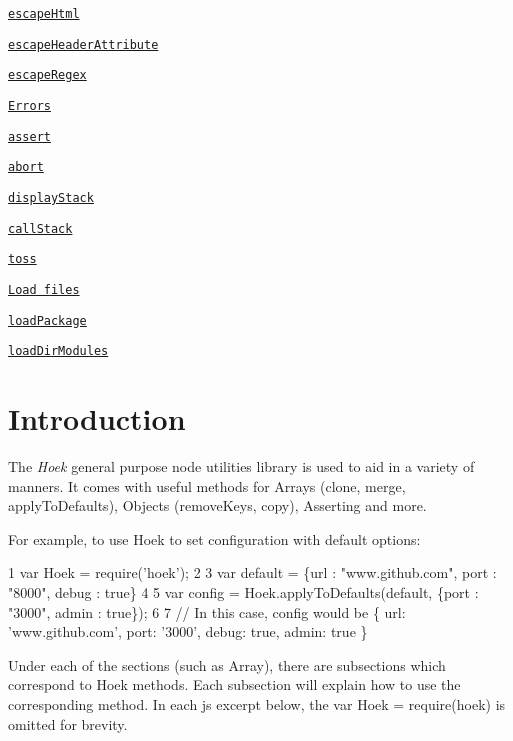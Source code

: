 \begin{DoxyItemize}
\begin{DoxyItemize}
\item \href{#escapeHtmlstring}{\tt escape\+Html}
\item \href{#escapeHeaderAttributeattribute}{\tt escape\+Header\+Attribute}
\item \href{#escapeRegexstring}{\tt escape\+Regex}
\end{DoxyItemize}
\item \href{#errors}{\tt Errors}
\begin{DoxyItemize}
\item \href{#assertmessage}{\tt assert}
\item \href{#abortmessage}{\tt abort}
\item \href{#displayStackslice}{\tt display\+Stack}
\item \href{#callStackslice}{\tt call\+Stack}
\item \href{#tosscondition}{\tt toss}
\end{DoxyItemize}
\item \href{#load-files}{\tt Load files}
\begin{DoxyItemize}
\item \href{#loadPackagedir}{\tt load\+Package}
\item \href{#loadDirModulespath-excludefiles-target}{\tt load\+Dir\+Modules}
\end{DoxyItemize}
\end{DoxyItemize}

\section*{Introduction}

The {\itshape Hoek} general purpose node utilities library is used to aid in a variety of manners. It comes with useful methods for Arrays (clone, merge, apply\+To\+Defaults), Objects (remove\+Keys, copy), Asserting and more.

For example, to use Hoek to set configuration with default options\+: 
\begin{DoxyCode}
1 var Hoek = require('hoek');
2 
3 var default = \{url : "www.github.com", port : "8000", debug : true\}
4 
5 var config = Hoek.applyToDefaults(default, \{port : "3000", admin : true\});
6 
7 // In this case, config would be \{ url: 'www.github.com', port: '3000', debug: true, admin: true \}
\end{DoxyCode}


Under each of the sections (such as Array), there are subsections which correspond to Hoek methods. Each subsection will explain how to use the corresponding method. In each js excerpt below, the var Hoek = require(\textquotesingle{}hoek\textquotesingle{}) is omitted for brevity.

